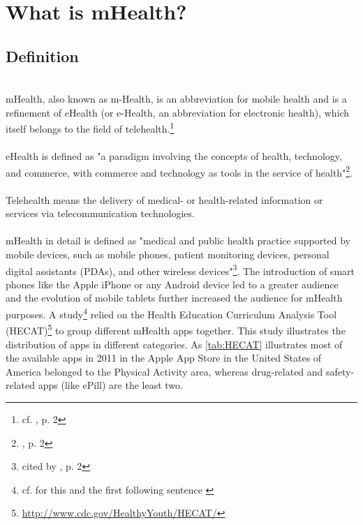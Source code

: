 \section{What is mHealth?}
\subsection{Definition}
\\
mHealth, also known as m-Health, is an abbreviation for mobile health and is a refinement of eHealth (or e-Health, an abbreviation for electronic health), which itself belongs to the field of telehealth.\footnote{cf. \cite{MartinezPerez.2013}, p. 2}
\\
\\
eHealth is defined as "a paradigm involving the concepts of health, technology, and commerce, with commerce and technology as tools in the service of health"\footnote{\cite{MartinezPerez.2013}, p. 2}.
\\
\\
Telehealth means the delivery of medical- or health-related information or services via telecommunication technologies.
\\
\\
mHealth in detail is defined as "medical and public health practice supported by mobile devices, such as mobile phones, patient monitoring devices, personal digital assistants (PDAs), and other wireless devices"\footnote{\cite{WorldHealthOrganization.2011} cited by \cite{MartinezPerez.2013}, p. 2}. The introduction of smart phones like the Apple iPhone or any Android device led to a greater audience and the evolution of mobile tablets further increased the audience for mHealth purposes. A study\footnote{cf. for this and the first following sentence \cite{West.2012}} relied on the Health Education Curriculum Analysis Tool (HECAT)\footnote{\url{http://www.cdc.gov/HealthyYouth/HECAT/}} to group different mHealth apps together. This study illustrates the distribution of apps in different categories. As \ref{tab:HECAT} illustrates most of the available apps in 2011 in the Apple App Store in the United States of America belonged to the Physical Activity area, whereas drug-related and safety-related apps (like ePill) are the least two. 
